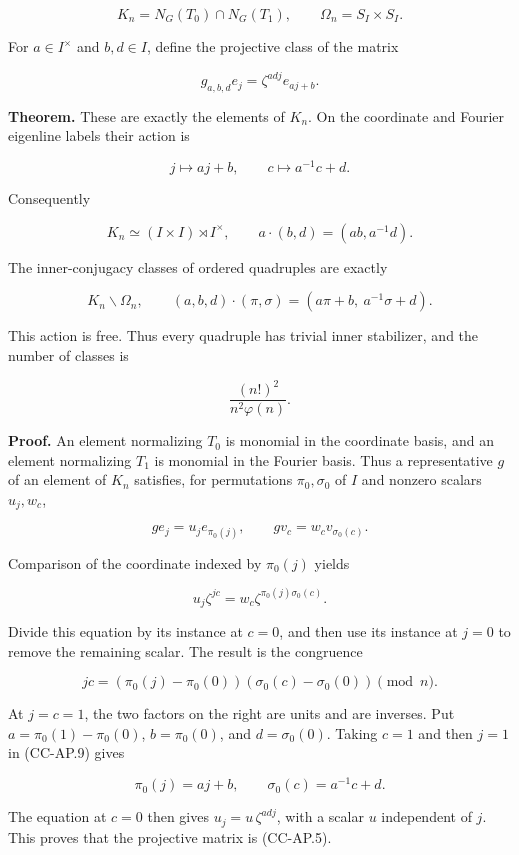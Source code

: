 \[
 K_n=N_G(T_0)\cap N_G(T_1),\qquad
 \Omega_n=S_I\times S_I.
\]

For \(a\in I^\times\) and \(b,d\in I\), define the projective class of
the matrix

\[
 g_{a,b,d}e_j=\zeta^{ad j}e_{aj+b}.
 \tag{CC-AP.5}
\]

\textbf{Theorem.} These are exactly the elements of \(K_n\). On the
coordinate and Fourier eigenline labels their action is

\[
 j\longmapsto aj+b,\qquad
 c\longmapsto a^{-1}c+d.
 \tag{CC-AP.6}
\]

Consequently

\[
 K_n\simeq(I\times I)\rtimes I^\times,\qquad
 a\cdot(b,d)=(ab,a^{-1}d).
\]

The inner-conjugacy classes of ordered quadruples are exactly

\[
 K_n\backslash\Omega_n,\qquad
 (a,b,d)\cdot(\pi,\sigma)
 =(a\pi+b,\ a^{-1}\sigma+d).
 \tag{CC-AP.7}
\]

This action is free. Thus every quadruple has trivial inner stabilizer,
and the number of classes is

\[
 \frac{(n!)^2}{n^2\varphi(n)}.
 \tag{CC-AP.8}
\]

\textbf{Proof.} An element normalizing \(T_0\) is monomial in the
coordinate basis, and an element normalizing \(T_1\) is monomial in the
Fourier basis. Thus a representative \(g\) of an element of \(K_n\)
satisfies, for permutations \(\pi_0,\sigma_0\) of \(I\) and nonzero
scalars \(u_j,w_c\),

\[
 ge_j=u_j e_{\pi_0(j)},\qquad
 gv_c=w_c v_{\sigma_0(c)}.
\]

Comparison of the coordinate indexed by \(\pi_0(j)\) yields

\[
 u_j\zeta^{jc}=w_c\zeta^{\pi_0(j)\sigma_0(c)}.
\]

Divide this equation by its instance at \(c=0\), and then use its
instance at \(j=0\) to remove the remaining scalar. The result is the
congruence

\[
 jc=(\pi_0(j)-\pi_0(0))(\sigma_0(c)-\sigma_0(0))
 \pmod n.
 \tag{CC-AP.9}
\]

At \(j=c=1\), the two factors on the right are units and are inverses.
Put \(a=\pi_0(1)-\pi_0(0)\), \(b=\pi_0(0)\), and \(d=\sigma_0(0)\).
Taking \(c=1\) and then \(j=1\) in (CC-AP.9) gives

\[
 \pi_0(j)=aj+b,\qquad \sigma_0(c)=a^{-1}c+d.
\]

The equation at \(c=0\) then gives \(u_j=u\,\zeta^{ad j}\), with a
scalar \(u\) independent of \(j\). This proves that the projective
matrix is (CC-AP.5).

